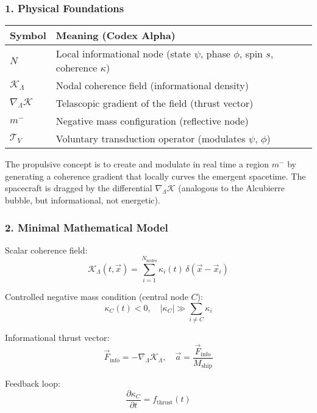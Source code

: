 \documentclass[12pt]{article}
\begin{document}
\subsubsection*{1. Physical Foundations}
\begin{table}[H]
\centering
\begin{tabular}{ll}
\toprule
\textbf{Symbol} & \textbf{Meaning (Codex Alpha)} \\
\midrule
$N$ & Local informational node (state $\psi$, phase $\phi$, spin $s$, coherence $\kappa$) \\
$\mathcal{K}_\Lambda$ & Nodal coherence field (informational density) \\
$\nabla_\Lambda \mathcal{K}$ & Telascopic gradient of the field (thrust vector) \\
$m^-$ & Negative mass configuration (reflective node) \\
$\mathcal{T}_V$ & Voluntary transduction operator (modulates $\psi$, $\phi$) \\
\bottomrule
\end{tabular}
\end{table}
The propulsive concept is to create and modulate in real time a region $m^-$ by generating a coherence gradient that locally curves the emergent spacetime. The spacecraft is dragged by the differential $\nabla_\Lambda \mathcal{K}$ (analogous to the Alcubierre bubble, but informational, not energetic).

\subsubsection*{2. Minimal Mathematical Model}

Scalar coherence field:
\[
\mathcal{K}_\Lambda(t,\vec{x}) = \sum_{i=1}^{N_{\text{nodes}}} \kappa_i(t)\, \delta(\vec{x} - \vec{x}_i)
\]

Controlled negative mass condition (central node $C$):
\[
\kappa_C(t) < 0, \quad |\kappa_C| \gg \sum_{i \ne C} \kappa_i
\]

Informational thrust vector:
\[
\vec{F}_{\text{info}} = - \nabla_\Lambda \mathcal{K}_\Lambda, \quad \vec{a} = \frac{\vec{F}_{\text{info}}}{M_{\text{ship}}}
\]

Feedback loop:
\[
\frac{\partial \kappa_C}{\partial t} = f_{\text{thrust}}(t)
\]
\end{document}
